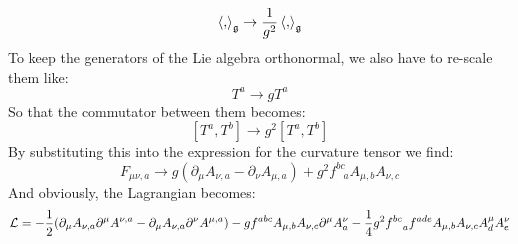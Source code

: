 \documentclass[12pt,a4paper]{report}
\theoremstyle{definition}
\theoremstyle{Theorem}
\theoremstyle{definition}
\theoremstyle{definition}
\begin{document}
	$$\braket{,}_\mathfrak{g}\rightarrow {1\over g^2}\braket{,}_\mathfrak{g}$$
	To keep the generators of the Lie algebra orthonormal, we also have to re-scale them like:
	$$T^a\rightarrow gT^a$$
	So that the commutator between them becomes:
	$$[T^a,T^b]\longrightarrow g^2[T^a,T^b]$$
	By substituting this into the expression for the curvature tensor we find:
	$$F_{\mu\nu,a}\rightarrow g(\partial_\mu A_{\nu,a}-\partial_\nu A_{\mu,a})+g^2 f^{bc}_{\hspace{9pt}a}A_{\mu,b}A_{\nu,c}$$
	And obviously, the Lagrangian becomes:
	$$\mathcal{L}=-{1\over 2}(\partial_\mu A_{\nu,a}\partial^\mu A^{\nu,a}-\partial_\mu A_{\nu,a}\partial^\nu A^{\mu,a})-gf^{abc}A_{\mu,b}A_{\nu,c}\partial^\mu A^{\nu}_{a}-{1\over 4}g^2 f^{bc}_{\hspace{9pt}a}f^{ade}A_{\mu,b}A_{\nu,c}A^{\mu}_dA^{\nu}_e$$
	\begin{comment}

\end{comment}
\end{document}
